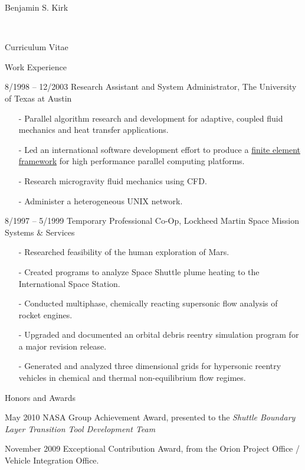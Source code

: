\documentclass[11pt]{report}
\begin{document}
\begin{cv}{\centerline{Benjamin S. Kirk}\\
    \centerline{\small Curriculum Vitae}}
\begin{cvlist}{Work Experience}
    \item[8/1998 -- 12/2003]
      Research Assistant and System Administrator, The University of Texas at Austin
      \small
      \begin{itemize}
	\item[-]
	  Parallel algorithm research and development for adaptive,
	  coupled fluid mechanics and heat transfer applications.
	\item[-]
	  Led an international software development effort to produce
          a \href{http://libmesh.sourceforge.net}{finite element framework}
	  for high performance parallel computing platforms.
	\item[-]
	  Research microgravity fluid mechanics using CFD.
	\item[-]
	  Administer a heterogeneous UNIX network.
      \end{itemize}
      \normalsize

      \item[8/1997 -- 5/1999]
	Temporary Professional Co-Op, Lockheed Martin Space Mission Systems \& Services
	\small
	\begin{itemize}
	  \item[-]
	    Researched feasibility of the human exploration of Mars.
	  \item[-]
	    Created programs to analyze Space Shuttle plume heating to the
	    International Space Station.
	  \item[-]
	    Conducted multiphase, chemically reacting supersonic flow analysis
	    of rocket engines.
	  \item[-]
	    Upgraded and documented an orbital debris reentry simulation program for
	    a major revision release.
	  \item[-]
	    Generated and analyzed three dimensional grids for hypersonic reentry
	    vehicles in chemical and thermal non-equilibrium flow regimes.
	\end{itemize}
	\normalsize
  \end{cvlist}

  \begin{cvlist}{Honors and Awards}

    \item[May 2010]
      NASA Group Achievement Award, presented to the {\em Shuttle Boundary Layer Transition Tool Development Team}

    \item[November 2009]
      Exceptional Contribution Award, from the Orion Project Office / Vehicle Integration Office.


\end{cvlist}
\end{cv}
\end{document}
